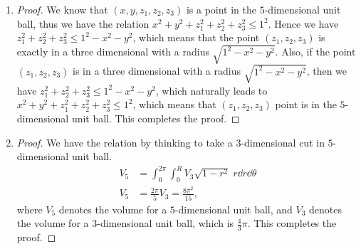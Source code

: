 \documentclass[8pt,twocolumn]{article}
\begin{document}
\begin{Answer}[number=34]
  \begin{enumerate}
    \item
      \begin{proof}
        We know that $(x,y,z_1,z_2,z_3)$ is a point in the $5$-dimensional unit
        ball, thus we have the relation $x^2+y^2+z_1^2+z_2^2+z_3^2 \le 1^2$.
        Hence we have $z_1^2+z_2^2+z_3^2 \le 1^2-x^2-y^2$, which means that the
        point $(z_1, z_2, z_3)$ is exactly in a three dimensional with a radius
        $\sqrt{1^2-x^2-y^2}$. Also, if the point $(z_1, z_2, z_3)$ is in
        a three dimensional with a radius $\sqrt{1^2-x^2-y^2}$, then we
        have $z_1^2+z_2^2+z_3^2 \le 1^2-x^2-y^2$, which naturally leads to
        $x^2+y^2+z_1^2+z_2^2+z_3^2 \le 1^2$, which means that $(z_1, z_2, z_3)$
        point is in the $5$-dimensional unit ball. This completes the proof.
      \end{proof}
    \item
      \begin{proof}
        We have the relation by thinking to take a $3$-dimensional cut in
        $5$-dimensional unit ball.
        \begin{align*}
          V_5&=\int_0^{2\pi} \int_0^R V_{3} \sqrt{1-r^2}\; r \dd{r}\dd{\theta}\\
          V_5&=\frac{2\pi}{5} V_3 = \frac{8\pi^2}{15},
        \end{align*}
        where $V_5$ denotes the volume for a $5$-dimensional unit ball, and
        $V_3$ denotes the volume for a $3$-dimensional unit ball, which is
        $\frac{4}{3}\pi$.
        This completes the proof.
      \end{proof}
  \end{enumerate}
\end{Answer}
\end{document}
